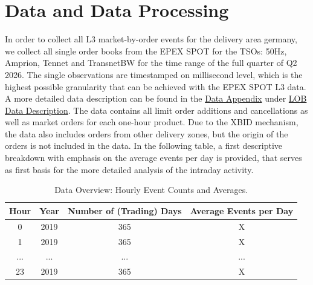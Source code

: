 \documentclass[12pt,a4paper]{cau_thesis}
\begin{document}
\section{Data and Data Processing}\label{sec:data}
In order to collect all L3 market-by-order events for the delivery
area germany, we collect all single order books from the EPEX SPOT
for the TSOs: 50Hz, Amprion, Tennet and TransnetBW for the time range
of the full quarter of Q2 2026. The single observations are
timestamped on millisecond level, which is the highest possible
granularity that can be achieved with the EPEX SPOT L3 data. A more
detailed data description can be found in the \hyperref[anhang2]{Data
    Appendix} under \hyperref[sec:lob_data_description]{LOB Data
    Description}. The data contains all limit order additions and
cancellations as well as market orders for each one-hour product. Due
to the XBID mechanism, the data also includes orders from other
delivery zones, but the origin of the orders is not included in the
data. In the following table, a first descriptive breakdown with
emphasis on the average events per day is provided, that serves as
first basis for the more detailed analysis of the intraday activity.
\begin{table}[htbp]
    \centering
    \begin{tabular}{|c|c|c|c|}
        \hline
        Hour & Year & Number of (Trading) Days & Average Events per Day \\
        \hline
        0    & 2019 & 365                      & X                      \\
        1    & 2019 & 365                      & X                      \\
        ...  & ...  & ...                      & ...                    \\
        23   & 2019 & 365                      & X                      \\
        \hline
    \end{tabular}
    \caption{Data Overview: Hourly Event Counts and Averages.}\label{tab:data_overview}
\end{table}
\end{document}
